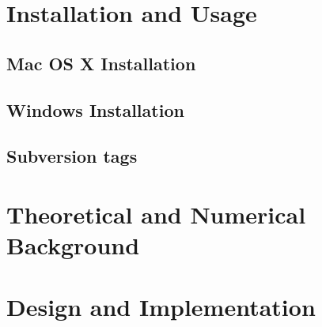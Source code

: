 \documentclass[letterpaper,twoside,openright,10pt]{memoir}
\begin{document}



\chapter{Installation and Usage}
\label{chap:Installation}




\newpage

\section{Mac OS X Installation}
\label{sec:MacOSXInstallation}




\newpage

\section{Windows Installation}
\label{sec:WindowsInstallation}




\section{Subversion tags}
\label{sec:SVN}




\chapter{Theoretical and Numerical Background}
\label{chap:Numerics}





\chapter{Design and Implementation}
\label{chap:Design}




\end{document}
